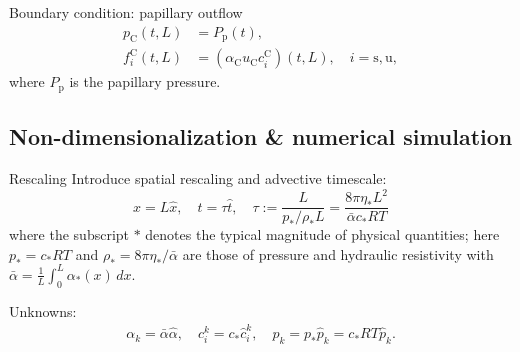 \documentclass{beamer}
\begin{document}
\begin{frame}{Boundary condition: papillary outflow}
    \begin{align}
        p_\mathrm{C} (t,L) &= P_{\mathrm{p}}(t),\\
        f_i^\mathrm{C}(t,L) &= (\alpha_\mathrm{C}  u_\mathrm{C}  c_i^\mathrm{C})(t,L),\quad i=\mathrm{s},\mathrm{u},
    \end{align}
        where $P_\mathrm{p}$ is the papillary pressure.
\end{frame}


\subsection{Non-dimensionalization \& numerical simulation}
\begin{frame}{Rescaling}
    Introduce spatial rescaling and advective timescale:
    \begin{equation}
        x = L\hat{x},\quad t = \tau\hat{t},\quad \tau:=\frac{L}{p_*/\rho_*L}=\frac{8\pi\eta_*L^2}{\bar{\alpha}c_*RT}
    \end{equation}
        where the subscript $*$ denotes the typical magnitude of physical quantities; here $p_* = c_*RT$ and $\rho_* = 8\pi\eta_*/\bar{\alpha}$ are those of pressure and hydraulic resistivity with $\bar{\alpha} = \frac{1}{L}\int_0^L\alpha_*(x)\,dx$.

    Unknowns:
    \begin{gather}
        \alpha_k = \bar{\alpha}\hat{\alpha},\quad c_i^k = c_*\hat{c}_i^k,\quad p_k = p_*\hat{p}_k = c_*RT\hat{p}_k.
    \end{gather}    
\end{frame}
\end{document}
